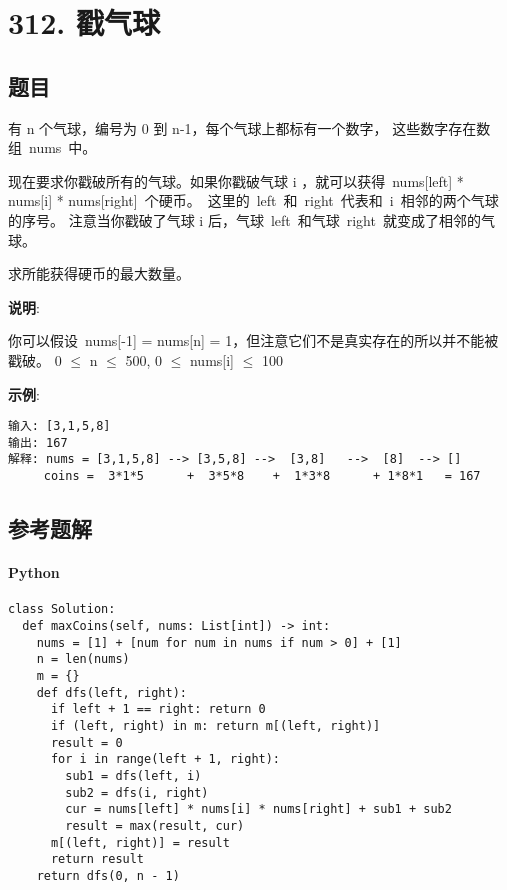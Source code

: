 \newpage
\section{312. 戳气球}
\label{leetcode:312}

\subsection{题目}

有 n 个气球，编号为 0 到 n-1，每个气球上都标有一个数字，
这些数字存在数组 nums 中。

现在要求你戳破所有的气球。如果你戳破气球 i ，就可以获得 nums[left] * nums[i] * nums[right] 个硬币。 这里的 left 和 right 代表和 i 相邻的两个气球的序号。
注意当你戳破了气球 i 后，气球 left 和气球 right 就变成了相邻的气球。

求所能获得硬币的最大数量。

\textbf{说明}:

你可以假设 nums[-1] = nums[n] = 1，但注意它们不是真实存在的所以并不能被戳破。
0 $\leq$ n $\leq$ 500, 0 $\leq$ nums[i] $\leq$ 100

\textbf{示例}:

\begin{verbatim}
输入: [3,1,5,8]
输出: 167
解释: nums = [3,1,5,8] --> [3,5,8] -->  [3,8]   -->  [8]  --> []
     coins =  3*1*5      +  3*5*8    +  1*3*8      + 1*8*1   = 167
\end{verbatim}

\subsection{参考题解}

\paragraph{Python}

\begin{verbatim}
class Solution:
  def maxCoins(self, nums: List[int]) -> int:
    nums = [1] + [num for num in nums if num > 0] + [1]
    n = len(nums)
    m = {}
    def dfs(left, right):
      if left + 1 == right: return 0
      if (left, right) in m: return m[(left, right)]
      result = 0
      for i in range(left + 1, right):
        sub1 = dfs(left, i)
        sub2 = dfs(i, right)
        cur = nums[left] * nums[i] * nums[right] + sub1 + sub2
        result = max(result, cur)
      m[(left, right)] = result
      return result
    return dfs(0, n - 1)
\end{verbatim}

